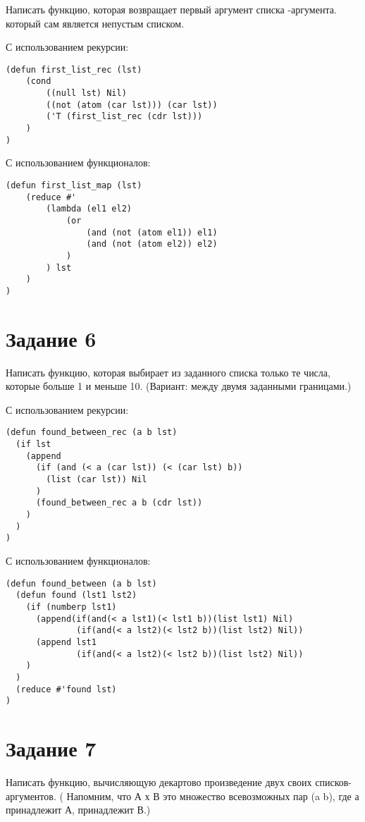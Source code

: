 Написать функцию, которая возвращает первый аргумент списка -аргумента.
который сам является непустым списком.

С использованием рекурсии:
\begin{lstlisting}
(defun first_list_rec (lst)
    (cond
        ((null lst) Nil)
        ((not (atom (car lst))) (car lst))
        ('T (first_list_rec (cdr lst)))
    )
)
\end{lstlisting}

С использованием функционалов:
\begin{lstlisting}
(defun first_list_map (lst)
    (reduce #'
        (lambda (el1 el2)
            (or
                (and (not (atom el1)) el1)
                (and (not (atom el2)) el2)
            )
        ) lst
    )
)
\end{lstlisting}


\section{Задание \No{}6}

Написать функцию, которая выбирает из заданного списка только те числа,
которые больше 1 и меньше 10.
(Вариант: между двумя заданными границами.)

С использованием рекурсии:

\begin{lstlisting}
(defun found_between_rec (a b lst)
  (if lst
    (append
      (if (and (< a (car lst)) (< (car lst) b))
      	(list (car lst)) Nil
      )
      (found_between_rec a b (cdr lst))
    )
  )
)
\end{lstlisting}

С использованием функционалов:

\begin{lstlisting}
(defun found_between (a b lst)
  (defun found (lst1 lst2)
    (if (numberp lst1)
      (append(if(and(< a lst1)(< lst1 b))(list lst1) Nil)
              (if(and(< a lst2)(< lst2 b))(list lst2) Nil))
      (append lst1
              (if(and(< a lst2)(< lst2 b))(list lst2) Nil))
    )
  )
  (reduce #'found lst)
)
\end{lstlisting}

\section{Задание \No{}7}

Написать функцию, вычисляющую декартово произведение двух своих списков-аргументов. ( Напомним, что А х В это множество всевозможных пар (a b), где а принадлежит А, принадлежит В.)

